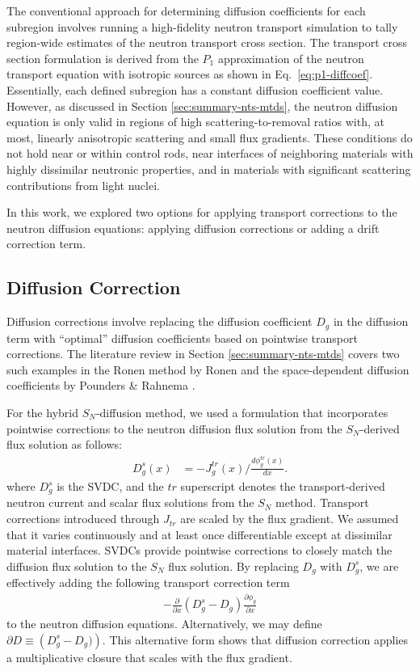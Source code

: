 The conventional approach for determining diffusion coefficients for each subregion involves
running a high-fidelity neutron transport simulation to tally region-wide estimates of the neutron
transport cross section. The transport cross section formulation is derived from the $P_1$
approximation of the neutron transport equation with isotropic sources \cite{bell_nuclear_1970} as
shown in Eq.\ \ref{eq:p1-diffcoef}.
Essentially, each defined subregion has a constant diffusion coefficient value. However, as
discussed in Section \ref{sec:summary-nts-mtds}, the neutron diffusion
equation is only valid in regions of high scattering-to-removal ratios with, at most, linearly
anisotropic scattering and small flux gradients. These conditions do not hold near or within
control rods, near interfaces of neighboring materials with highly dissimilar neutronic properties,
and in materials with significant scattering contributions from light nuclei.

In this work, we explored two options for applying
transport corrections to the neutron diffusion equations: applying
diffusion corrections or adding a drift correction term.

\subsection{Diffusion Correction}

Diffusion corrections involve replacing the diffusion coefficient $D_g$ in the
diffusion term with ``optimal'' diffusion coefficients based on
pointwise transport corrections. The literature review in Section \ref{sec:summary-nts-mtds} covers
two such
examples in the Ronen method by Ronen \cite{ronen_accurate_2004} and the space-dependent diffusion
coefficients by Pounders \& Rahnema \cite{pounders_diffusion_2009}.

For the hybrid $S_N$-diffusion method, we used a formulation that incorporates pointwise
corrections to the neutron diffusion flux solution from the $S_N$-derived flux solution as follows:
%
\begin{align}
  D^s_g(x) &= -J^{tr}_g(x)\bigg/\frac{d\phi^{tr}_g(x)}{dx}. \label{eq:svdc}
\end{align}
%
where $D^s_g$ is the \gls{SVDC}, and the $tr$ superscript denotes the transport-derived neutron
current and scalar flux solutions from the $S_N$ method. Transport corrections introduced through
$J_{tr}$ are scaled by the flux gradient. We assumed that it varies continuously and
at least once differentiable except at dissimilar material interfaces. \glspl{SVDC} provide
pointwise corrections to closely match the diffusion flux solution to the $S_N$ flux solution.
By replacing $D_g$ with $D^s_g$, we are effectively adding the following transport correction term
%
\begin{gather}
  -\frac{\partial}{\partial x}(D^s_g-D_g)\frac{\partial\phi_g}{\partial x}
\end{gather}
to the neutron diffusion equations. Alternatively, we may define
$\partial D\equiv\left(D^s_g-D_g)\right)$. This alternative form shows that diffusion
correction applies a multiplicative closure that scales with the flux gradient.

